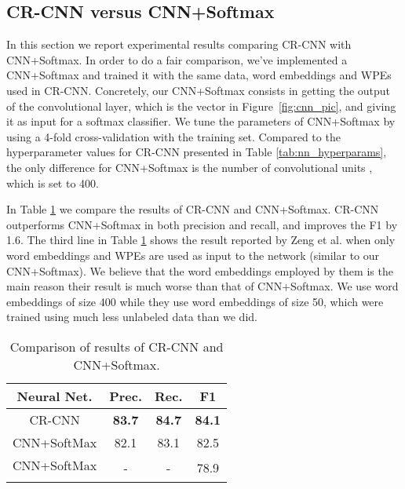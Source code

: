 \documentclass[11pt]{article}
\begin{document}
\subsection{CR-CNN versus CNN+Softmax}
In this section we report experimental results comparing CR-CNN with CNN+Softmax.
In order to do a fair comparison,
we've implemented a CNN+Softmax and trained it with the same data, word embeddings and WPEs used in CR-CNN.
Concretely, 
our CNN+Softmax consists in getting the output of the convolutional layer,
which is the vector  in Figure~\ref{fig:cnn_pic},
and giving it as input for a softmax classifier.
We tune the parameters of CNN+Softmax by using a 4-fold cross-validation with the training set.
Compared to the hyperparameter values for CR-CNN presented in Table \ref{tab:nn_hyperparams},
the only difference for CNN+Softmax is the number of convolutional units , 
which is set to 400.

In Table \ref{tab:res:cnnsoftmax} we compare the results of CR-CNN and CNN+Softmax.
CR-CNN outperforms CNN+Softmax in both precision and recall,
and improves the F1 by 1.6.
The third line in Table \ref{tab:res:cnnsoftmax} shows the result reported by Zeng et al.  when only word embeddings and WPEs are used as input to the network (similar to our CNN+Softmax).
We believe that the word embeddings employed by them is the main reason their result is much worse than that of CNN+Softmax.
We use word embeddings of size 400 while they use word embeddings of size 50,
which were trained using much less unlabeled data than we did. 

\begin{table}[h!]
\begin{center}
\begin{tabular}{|c|ccc|}
\hline  \bf Neural Net. & \bf \bf Prec. & \bf Rec. & \bf F1 \\ 
\hline
CR-CNN      & \bf 83.7 & \bf 84.7 & \bf 84.1 \\
CNN+SoftMax & 82.1     & 83.1     & 82.5 \\
\hline
CNN+SoftMax  & \multirow{2}{*}{-} & \multirow{2}{*}{-} & \multirow{2}{*}{78.9} \\
\cite{zeng2014:coling} &  & & \\ 
\hline
\end{tabular}
\end{center}
\caption{\label{tab:res:cnnsoftmax} Comparison of results of CR-CNN and CNN+Softmax.}
\end{table}
\end{document}
